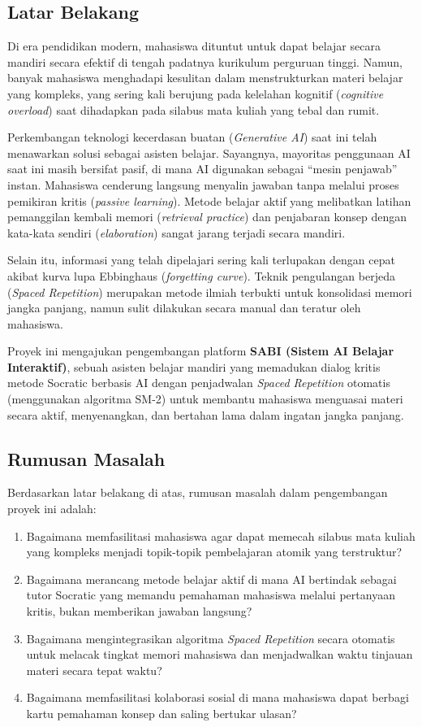 \documentclass[12pt,a4paper]{article}
\begin{document}
\subsection{Latar Belakang}
Di era pendidikan modern, mahasiswa dituntut untuk dapat belajar secara mandiri secara efektif di tengah padatnya kurikulum perguruan tinggi. Namun, banyak mahasiswa menghadapi kesulitan dalam menstrukturkan materi belajar yang kompleks, yang sering kali berujung pada kelelahan kognitif (\textit{cognitive overload}) saat dihadapkan pada silabus mata kuliah yang tebal dan rumit.

Perkembangan teknologi kecerdasan buatan (\textit{Generative AI}) saat ini telah menawarkan solusi sebagai asisten belajar. Sayangnya, mayoritas penggunaan AI saat ini masih bersifat pasif, di mana AI digunakan sebagai ``mesin penjawab'' instan. Mahasiswa cenderung langsung menyalin jawaban tanpa melalui proses pemikiran kritis (\textit{passive learning}). Metode belajar aktif yang melibatkan latihan pemanggilan kembali memori (\textit{retrieval practice}) dan penjabaran konsep dengan kata-kata sendiri (\textit{elaboration}) sangat jarang terjadi secara mandiri.

Selain itu, informasi yang telah dipelajari sering kali terlupakan dengan cepat akibat kurva lupa Ebbinghaus (\textit{forgetting curve}). Teknik pengulangan berjeda (\textit{Spaced Repetition}) merupakan metode ilmiah terbukti untuk konsolidasi memori jangka panjang, namun sulit dilakukan secara manual dan teratur oleh mahasiswa. 

Proyek ini mengajukan pengembangan platform \textbf{SABI (Sistem AI Belajar Interaktif)}, sebuah asisten belajar mandiri yang memadukan dialog kritis metode Socratic berbasis AI dengan penjadwalan \textit{Spaced Repetition} otomatis (menggunakan algoritma SM-2) untuk membantu mahasiswa menguasai materi secara aktif, menyenangkan, dan bertahan lama dalam ingatan jangka panjang.

\subsection{Rumusan Masalah}
Berdasarkan latar belakang di atas, rumusan masalah dalam pengembangan proyek ini adalah:
\begin{enumerate}
    \item Bagaimana memfasilitasi mahasiswa agar dapat memecah silabus mata kuliah yang kompleks menjadi topik-topik pembelajaran atomik yang terstruktur?
    \item Bagaimana merancang metode belajar aktif di mana AI bertindak sebagai tutor Socratic yang memandu pemahaman mahasiswa melalui pertanyaan kritis, bukan memberikan jawaban langsung?
    \item Bagaimana mengintegrasikan algoritma \textit{Spaced Repetition} secara otomatis untuk melacak tingkat memori mahasiswa dan menjadwalkan waktu tinjauan materi secara tepat waktu?
    \item Bagaimana memfasilitasi kolaborasi sosial di mana mahasiswa dapat berbagi kartu pemahaman konsep dan saling bertukar ulasan?
\end{enumerate}
\end{document}
